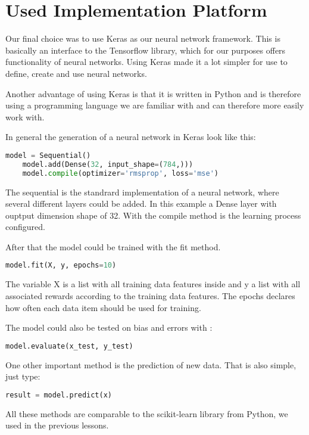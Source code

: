 \section{Used Implementation Platform}
Our final choice was to use Keras as our neural network framework. This is basically an interface to the Tensorflow library, which for our purposes offers functionality of neural networks. Using Keras made it a lot simpler for use to define, create and use neural networks.

Another advantage of using Keras is that it is written in Python and is therefore using a programming language we are familiar with and can therefore more easily work with.

In general the generation of a neural network in Keras look like this:
\begin{lstlisting}[frame=single,language=Python,caption={Creation of a neural network in Keras},captionpos=b]
	model = Sequential()
	model.add(Dense(32, input_shape=(784,)))
	model.compile(optimizer='rmsprop', loss='mse')
\end{lstlisting}
 The sequential is the standrard implementation of a neural network, where several different layers could be added. In this example a Dense layer with ouptput dimension shape of 32. With the compile method is the learning process configured. 

After that the model could be trained with the fit method. 
\begin{lstlisting}[frame=single,language=Python,caption={Trianing of a neural network in Keras},captionpos=b]
	model.fit(X, y, epochs=10)
\end{lstlisting}
The variable X is a list with all training data features inside and y a list with all associated rewards according to the training data features. The epochs declares how often each data item should be used for training.

The model could also be tested on bias and errors with :
\begin{lstlisting}[frame=single,language=Python,caption={Evaluation of a neural network in Keras},captionpos=b]
	model.evaluate(x_test, y_test)
\end{lstlisting}

One other important method is the prediction of new data. That is also simple, just type:
\begin{lstlisting}[frame=single,language=Python,caption={Predicting of a neural network in Keras},captionpos=b]
	result = model.predict(x)
\end{lstlisting}

All these methods are comparable to the scikit-learn library from Python, we used in the previous lessons.